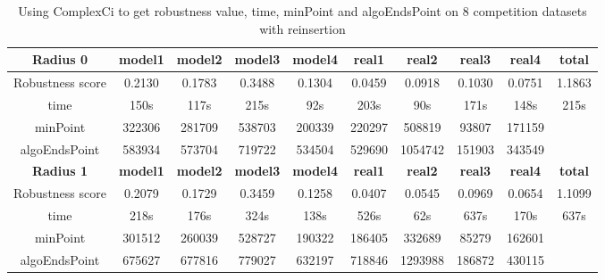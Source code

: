 \documentclass{article}
\begin{document}
	\begin{table}[!htbp]
		\begin{adjustwidth}{-1cm}{}		
		\begin{threeparttable}		
		\centering
		\caption{Using ComplexCi to get robustness value, time, minPoint and algoEndsPoint on 8 competition datasets with reinsertion}
		\label{tab:table6}
		\begin{tabular}{|c|c|c|c|c|c|c|c|c|c|}
			\hline
			\textbf{Radius 0} & \textbf{model1} & \textbf{model2} & \textbf{model3} & \textbf{model4} & \textbf{real1} & \textbf{real2} & \textbf{real3} & \textbf{real4} & \textbf{total} \\ \hline
			Robustness score                   & 0.2130          & 0.1783          & 0.3488          & 0.1304          & 0.0459         & 0.0918         & 0.1030         & 0.0751         & 1.1863         \\ \hline
			time                    & 150s            & 117s            & 215s            & 92s             & 203s           & 90s            & 171s           & 148s           & 215s           \\ \hline
			minPoint                & 322306          & 281709          & 538703          & 200339          & 220297         & 508819         & 93807          & 171159         &                \\ \hline
			algoEndsPoint           & 583934          & 573704          & 719722          & 534504          & 529690         & 1054742        & 151903         & 343549         &                \\ \hline
			
			\textbf{Radius 1} & \textbf{model1} & \textbf{model2} & \textbf{model3} & \textbf{model4} & \textbf{real1} & \textbf{real2} & \textbf{real3} & \textbf{real4} & \textbf{total} \\ \hline
			Robustness score                            & 0.2079          & 0.1729          & 0.3459          & 0.1258          & 0.0407         & 0.0545         & 0.0969         & 0.0654         & 1.1099         \\ \hline
			time                             & 218s            & 176s            & 324s            & 138s            & 526s           & 62s            & 637s           & 170s           & 637s           \\ \hline
			minPoint                         & 301512          & 260039          & 528727          & 190322          & 186405         & 332689         & 85279          & 162601         &                \\ \hline
			algoEndsPoint                    & 675627          & 677816          & 779027          & 632197          & 718846         & 1293988        & 186872         & 430115         &                \\ \hline		
			

\end{tabular}
\end{threeparttable}
\end{adjustwidth}
\end{table}
\end{document}
